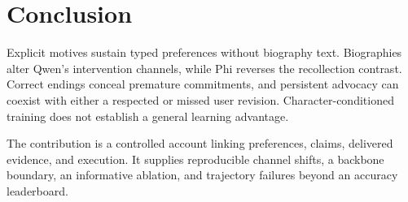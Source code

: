 \documentclass{svproc}
\begin{document}
\section{Conclusion}
Explicit motives sustain typed preferences without biography text. Biographies alter Qwen's intervention channels, while Phi reverses the recollection contrast. Correct endings conceal premature commitments, and persistent advocacy can coexist with either a respected or missed user revision. Character-conditioned training does not establish a general learning advantage.

The contribution is a controlled account linking preferences, claims, delivered evidence, and execution. It supplies reproducible channel shifts, a backbone boundary, an informative ablation, and trajectory failures beyond an accuracy leaderboard.
\end{document}
